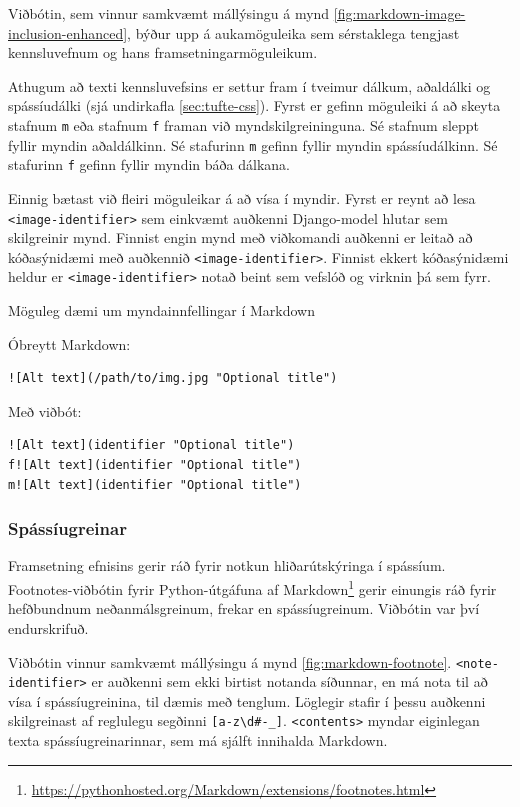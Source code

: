 \documentclass[a4paper,12pt,twoside,BCOR=10mm]{scrbook}
\begin{document}
Viðbótin, sem vinnur samkvæmt mállýsingu á mynd \ref{fig:markdown-image-inclusion-enhanced}, býður upp á aukamöguleika sem sérstaklega tengjast kennsluvefnum og hans framsetningarmöguleikum.

Athugum að texti kennsluvefsins er settur fram í tveimur dálkum, aðaldálki og spássíudálki (sjá undirkafla \ref{sec:tufte-css}). Fyrst er gefinn möguleiki á að skeyta stafnum \texttt{m} eða stafnum \texttt{f} framan við myndskilgreininguna. Sé stafnum sleppt fyllir myndin aðaldálkinn. Sé stafurinn \texttt{m} gefinn fyllir myndin spássíudálkinn. Sé stafurinn \texttt{f} gefinn fyllir myndin báða dálkana.

Einnig bætast við fleiri möguleikar á að vísa í myndir. Fyrst er reynt að lesa \texttt{<image-identifier>} sem einkvæmt auðkenni Django-model hlutar sem skilgreinir mynd. Finnist engin mynd með viðkomandi auðkenni er leitað að kóðasýnidæmi með auðkennið \texttt{<image-identifier>}. Finnist ekkert kóðasýnidæmi heldur er \texttt{<image-identifier>} notað beint sem vefslóð og virknin þá sem fyrr.
\begin{listing}
\caption{Möguleg dæmi um myndainnfellingar í Markdown}
\label{fig:markdown-image-examples}
Óbreytt Markdown:
\begin{verbatim}
![Alt text](/path/to/img.jpg "Optional title")
\end{verbatim}
Með viðbót:
\begin{verbatim}
![Alt text](identifier "Optional title")
f![Alt text](identifier "Optional title")
m![Alt text](identifier "Optional title")
\end{verbatim}
\end{listing}


\subsubsection{Spássíugreinar}
Framsetning efnisins gerir ráð fyrir notkun hliðarútskýringa í spássíum. Footnotes-viðbótin fyrir Python-útgáfuna af Markdown\footnote{\url{https://pythonhosted.org/Markdown/extensions/footnotes.html}} gerir einungis ráð fyrir hefðbundnum neðanmálsgreinum, frekar en spássíugreinum. Viðbótin var því endurskrifuð.

Viðbótin vinnur samkvæmt mállýsingu á mynd \ref{fig:markdown-footnote}. \texttt{<note-identifier>} er auðkenni sem ekki birtist notanda síðunnar, en má nota til að vísa í spássíugreinina, til dæmis með tenglum. Löglegir stafir í þessu auðkenni skilgreinast af reglulegu segðinni \verb|[a-z\d#-_]|. \texttt{<contents>} myndar eiginlegan texta spássíugreinarinnar, sem má sjálft innihalda Markdown.
\end{document}

